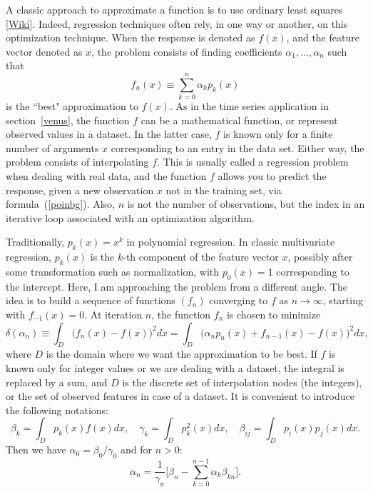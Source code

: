 \documentclass[oneside,10pt]{book}
\begin{document}
A classic approach to approximate a function is to use
\textcolor{index}{ordinary least squares} [\href{https://en.wikipedia.org/wiki/Ordinary_least_squares}{Wiki}]. Indeed, regression techniques often rely, in one way or another, on this optimization technique. When the response is denoted as $f(x)$, and the feature vector denoted as $x$, the problem consists of finding coefficients $\alpha_1,\dots,\alpha_n$ such that
\begin{equation}
f_n(x) \equiv \sum_{k=0}^n \alpha_k p_k(x) \label{poinbg}
\end{equation}
is the ``best" approximation to $f(x)$. As in the time series application in section~\ref{venus}, the function $f$ can be a mathematical function, or represent observed values in a dataset. In the latter case, $f$ is known only for a finite number of arguments $x$ corresponding to an entry in the data set. Either way, the problem consists of interpolating $f$. This is usually called a regression problem when dealing with real data, and the function $f$ allows you to predict the response, given a new observation $x$ not in the training set, via formula~(\ref{poinbg}). Also, $n$ is not the number of observations, but the index in an iterative loop associated with an optimization algorithm.

Traditionally, $p_k(x)=x^k$ in polynomial regression. In classic multivariate regression, $p_k(x)$ is the $k$-th component of the feature vector $x$, possibly after some transformation such as normalization, with $p_0(x)=1$ corresponding to the intercept.  Here, I am approaching the problem from a different angle. The idea is to build a sequence of functions $(f_n)$ converging to $f$ as $n\rightarrow \infty$, starting with $f_{-1}(x)=0$. At iteration $n$, the function $f_n$ is chosen to minimize
\begin{equation}
\delta(\alpha_n)\equiv \int_D \Big(f_n(x)-f(x)\Big)^2 dx = \int_D \Big(\alpha_n p_n(x) + f_{n-1}(x) - f(x)\Big)^2 dx, \label{tupues}
\end{equation}
where $D$ is the domain where we want the approximation to be best. If $f$ is known only for integer values or we are dealing with a dataset, the integral is replaced by a sum, and $D$ is the discrete set of interpolation nodes (the integers), or the set of observed features in case of a dataset. It is convenient to introduce the following notations:
$$
\beta_k = \int_D p_k(x)f(x)dx, \quad \gamma_k = \int_D p_k^2(x)dx, \quad \beta_{ij} = \int_D p_i(x)p_j(x)dx.
$$
Then we have $\alpha_0 = \beta_0/\gamma_0$ and for $n>0$:
$$
\alpha_n = \frac{1}{\gamma_n} \Bigg[\beta_n - \sum_{k=0}^{n-1} \alpha_k\beta_{kn} \Bigg].
$$
\end{document}
